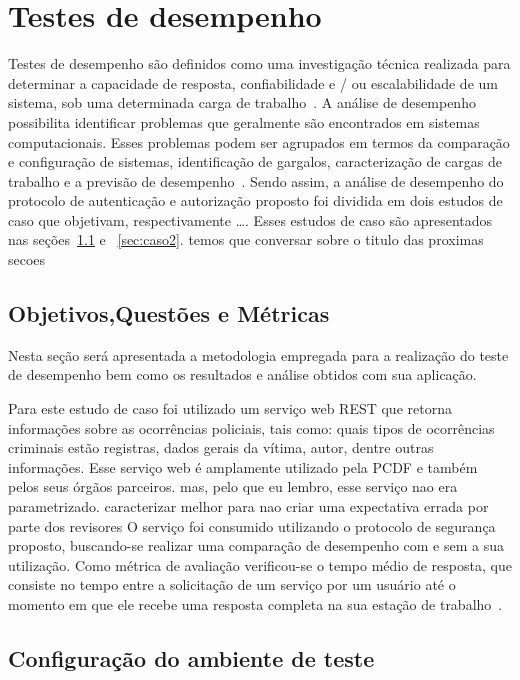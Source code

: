 \section{Testes de desempenho}

Testes de desempenho são definidos como uma investigação técnica realizada para determinar a capacidade de resposta, confiabilidade e / ou escalabilidade de um sistema, sob uma determinada carga de trabalho~\cite{Meier2007}.
A análise de desempenho possibilita identificar problemas que geralmente são encontrados em sistemas computacionais. Esses problemas podem ser agrupados em termos da comparação e configuração de sistemas, identificação de gargalos, caracterização de cargas de trabalho e a previsão de desempenho~\cite{jain1991art}. Sendo assim, a análise de desempenho do protocolo de autenticação e autorização proposto foi dividida em dois estudos de caso que {\color{red}objetivam, respectivamente \ldots}. Esses estudos de caso
são apresentados nas seções~\ref{sec:caso1} e ~\ref{sec:caso2}. {\color{red}temos que conversar sobre o titulo das proximas secoes}

\subsection{Objetivos,Questões e Métricas}\label{sec:caso1}

Nesta seção será apresentada a metodologia empregada para a realização do teste de desempenho bem como os resultados e análise obtidos com sua aplicação.

Para este estudo de caso foi utilizado um serviço web REST que retorna informações sobre as ocorrências policiais, tais como: quais tipos de ocorrências criminais estão registras, dados gerais da vítima, autor, dentre outras informações. Esse serviço web é amplamente utilizado pela PCDF e também pelos seus órgãos parceiros. {\color{red}mas, pelo que eu lembro, esse servi\c co nao era parametrizado. caracterizar melhor para nao criar uma expectativa errada por parte dos revisores} O serviço foi consumido utilizando o protocolo de segurança proposto, buscando-se realizar uma comparação de desempenho com e sem a sua utilização. Como métrica de avaliação verificou-se o tempo médio de resposta, que consiste no tempo entre a solicitação de um serviço por um usuário até o momento em que ele recebe uma resposta completa na sua estação de trabalho~\cite{ Molyneaux2009}.

\subsection{Configuração do ambiente de teste}

